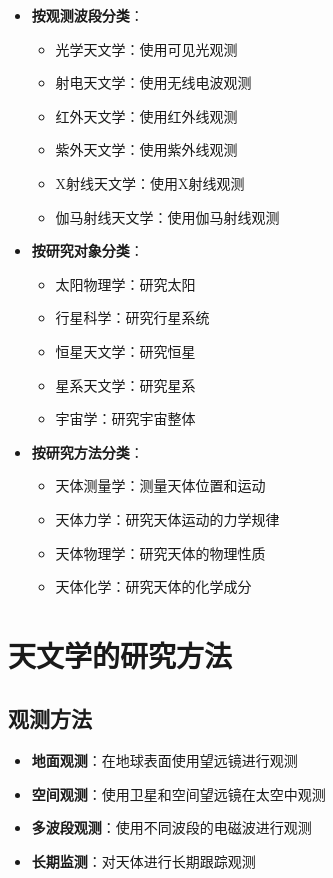 \documentclass[12pt,UTF8]{ctexbook}
\begin{document}
\begin{itemize}
  \item \textbf{按观测波段分类}：
    \begin{itemize}
      \item 光学天文学：使用可见光观测
      \item 射电天文学：使用无线电波观测
      \item 红外天文学：使用红外线观测
      \item 紫外天文学：使用紫外线观测
      \item X射线天文学：使用X射线观测
      \item 伽马射线天文学：使用伽马射线观测
    \end{itemize}
  \item \textbf{按研究对象分类}：
    \begin{itemize}
      \item 太阳物理学：研究太阳
      \item 行星科学：研究行星系统
      \item 恒星天文学：研究恒星
      \item 星系天文学：研究星系
      \item 宇宙学：研究宇宙整体
    \end{itemize}
  \item \textbf{按研究方法分类}：
    \begin{itemize}
      \item 天体测量学：测量天体位置和运动
      \item 天体力学：研究天体运动的力学规律
      \item 天体物理学：研究天体的物理性质
      \item 天体化学：研究天体的化学成分
    \end{itemize}
\end{itemize}

\section{天文学的研究方法}

\subsection{观测方法}

\begin{itemize}
  \item \textbf{地面观测}：在地球表面使用望远镜进行观测
  \item \textbf{空间观测}：使用卫星和空间望远镜在太空中观测
  \item \textbf{多波段观测}：使用不同波段的电磁波进行观测
  \item \textbf{长期监测}：对天体进行长期跟踪观测
\end{itemize}
\end{document}

